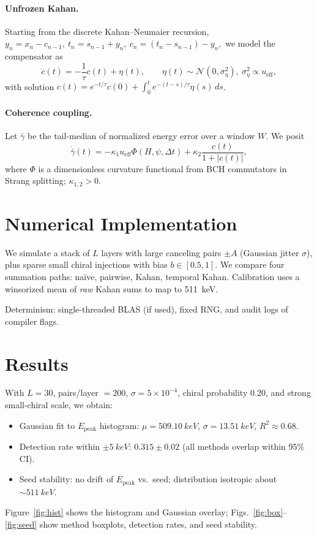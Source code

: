 \documentclass[11pt]{article}
\newcommand{\Epeak}{E_{\mathrm{peak}}}
\newcommand{\ueff}{u_{\mathrm{eff}}}
\newcommand{\Rtwo}{R^2}
\begin{document}
\paragraph{Unfrozen Kahan.}
Starting from the discrete Kahan–Neumaier recursion,
\(
y_n = x_n - c_{n-1},~
t_n = s_{n-1}+y_n,~
c_n=(t_n-s_{n-1})-y_n,
\)
we model the compensator as
\begin{equation}
\dot c(t)= -\frac{1}{\tau}c(t)+\eta(t), \qquad \eta(t)\sim \mathcal{N}(0,\sigma_\eta^2),~\sigma_\eta^2\propto \ueff,
\end{equation}
with solution \(c(t)=e^{-t/\tau}c(0)+\int_0^t e^{-(t-s)/\tau}\eta(s)\,ds\).

\paragraph{Coherence coupling.}
Let \(\bar\gamma\) be the tail-median of normalized energy error over a window \(W\). We posit
\begin{equation}
\dot{\bar\gamma}(t)= -\kappa_1 \ueff \Phi(H,\psi,\Delta t) + \kappa_2 \frac{c(t)}{1+|c(t)|},
\end{equation}
where \(\Phi\) is a dimensionless curvature functional from BCH commutators in Strang splitting; \(\kappa_{1,2}>0\).

\section{Numerical Implementation}
We simulate a stack of \(L\) layers with large canceling pairs \(\pm A\) (Gaussian jitter \(\sigma\)), plus sparse small chiral injections with bias \(b\in[0.5,1]\). We compare four summation paths: na\"ive, pairwise, Kahan, temporal Kahan. Calibration uses a winsorized mean of \emph{raw} Kahan sums to map to \SI{511}{keV}.

Determinism: single-threaded BLAS (if used), fixed RNG, and audit logs of compiler flags.

\section{Results}
With \(L=30\), pairs/layer \(=200\), \(\sigma=5\times 10^{-4}\), chiral probability \(0.20\), and strong small-chiral scale, we obtain:
\begin{itemize}
\item Gaussian fit to \(\Epeak\) histogram: \(\mu=\SI{509.10}{keV}\), \(\sigma=\SI{13.51}{keV}\), \(\Rtwo\approx 0.68\).
\item Detection rate within \(\pm\SI{5}{keV}\): \(0.315\pm 0.02\) (all methods overlap within 95\% CI).
\item Seed stability: no drift of \(\Epeak\) vs.\ seed; distribution isotropic about \(\sim\SI{511}{keV}\).
\end{itemize}
Figure~\ref{fig:hist} shows the histogram and Gaussian overlay; Figs.~\ref{fig:box}–\ref{fig:seed} show method boxplots, detection rates, and seed stability.
\end{document}
